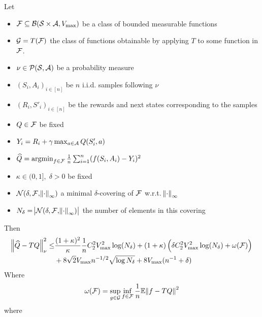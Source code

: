 
\begin{thm}\label{thm:oneStep}
  Let
  \begin{itemize}
    \item $\mathcal{F} \subseteq \mathcal{B}(\mathcal{S}\times\mathcal{A}, V_{\max})$
      be a class of bounded measurable functions
    \item $\mathcal{G} = T(\mathcal{F})$ the class of functions obtainable by
      applying $T$ to some function in $\mathcal{F}$.
    \item $\nu \in \mathcal{P}(\mathcal{S},\mathcal{A})$ be a probability measure
    \item $(S_i, A_i)_{i\in[n]}$ be $n$ i.i.d. samples following $\nu$
    \item $(R_i, S'_i)_{i\in[n]}$ be the rewards and next states
    	corresponding to the samples
    \item $Q \in \mathcal{F}$ be fixed
    \item $Y_i = R_i + \gamma \max_{a \in \mathcal{A}} Q(S'_i, a)$
    \item $\widehat{Q} = \operatorname*{argmin}_{f \in \mathcal{F}} \frac{1}{n}
      \sum_{i=1}^n (f(S_i, A_i) - Y_i)^2$
    \item $\kappa \in (0,1],\; \delta > 0$ be fixed
    \item $\mathcal{N}(\delta, \mathcal{F}, \norm{\cdot}_\infty)$
      a minimal $\delta$-covering of $\mathcal{F}$ w.r.t. $\norm{\cdot}_\infty$
    \item $N_\delta = \abs{\mathcal{N}(\delta, \mathcal{F}, \norm{\cdot}_\infty)}$
      the number of elements in this covering
  \end{itemize}
  Then
  \begin{align*}
    \norm{\widehat{Q} - TQ}_\nu^2
    \leq & \frac{(1+\kappa)^2}{\kappa} \frac{1}{n} C_2^2 V_{\max}^2 \log(N_\delta)
    + (1 + \kappa) \left( \delta C_2^2 V_{\max}^2 \log(N_\delta)
    + \omega(\mathcal{F}) \right) 
    \notag
    \\ & + 8 \sqrt{2} V_{\max} n^{-1/2} \sqrt{\log N_\delta}
    + 8 V_{\max} (n^{-1} + \delta)
  \end{align*}
  Where
  \begin{equation*}
    \omega(\mathcal{F}) = \sup_{g \in \mathcal{G}} \inf_{f \in \mathcal{F}}
    \frac{1}{n} \mathbb{E} \norm{f - TQ}^2
  \end{equation*}
  where
\end{thm}
